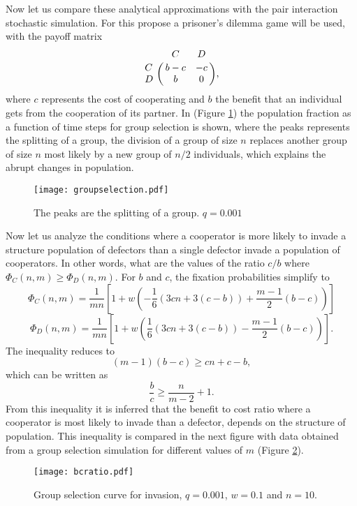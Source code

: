 Now let us compare these analytical approximations with the pair interaction stochastic simulation. For this propose  a prisoner's dilemma  game will be used,  with the payoff matrix
\begin{equation}
\bordermatrix{~ & C & D \cr
             C & b-c & -c \cr
              D & b & 0 \cr},
\end{equation}
where $c$ represents the cost of cooperating and $b$ the benefit that an individual gets from the cooperation of its partner. In (Figure \ref{Fig5.4})  the population fraction as a function of time steps for group selection is shown, where the peaks represents the splitting of a group, the division of a group of size $n$ replaces another group of size $n$ most likely by a new group of $n/2$ individuals, which explains the abrupt changes in population.     
\begin{figure}[H]\label{Fig5.4}
        \begin{center}
  \texttt{[image: groupselection.pdf]}
     \end{center}
      \caption{The peaks are the splitting of a group. $q=0.001$} 
   \end{figure}
Now let us analyze the conditions where a cooperator is more likely to invade a structure population of defectors than a single defector invade  a population of cooperators. In other words, what are the values of the ratio $c/b$ where $\Phi_{C}(n,m)\geq \Phi_{D}(n,m)$. For $b$ and $c$, the fixation probabilities simplify to
\begin{equation}
\Phi_{C}(n,m)=\frac{1}{mn}\left[1+w\left(-\frac{1}{6}(3cn+3(c-b))+\frac{m-1}{2}(b-c)\right)\right] 
\end{equation}
\begin{equation}
\Phi_{D}(n,m)=\frac{1}{mn}\left[1+w\left(\frac{1}{6}(3cn+3(c-b))-\frac{m-1}{2}(b-c)\right)\right].
\end{equation}
The inequality reduces to
\begin{equation}
(m-1)(b-c)\geq cn + c-b ,
\end{equation}
which can be written as
\begin{equation}
\frac{b}{c}\geq \frac{n}{m-2} + 1.
\end{equation}
From this inequality it is inferred  that the benefit to cost ratio where a cooperator is most likely to invade than a defector, depends on the structure of population. This inequality is compared in the next figure with data obtained from a group selection simulation for different values of $m$ (Figure \ref{}).
\begin{figure}[H]\label{}
        \begin{center}
  \texttt{[image: bcratio.pdf]}
     \end{center}
      \caption{Group selection curve for invasion, $q=0.001$, $w=0.1$ and $n=10$.} 
   \end{figure}
